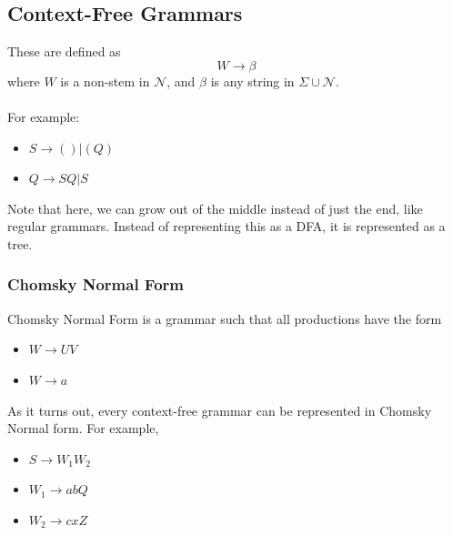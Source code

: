 \documentclass[10pt]{article}
\begin{document}
\subsection*{Context-Free Grammars}
These are defined as
\[W \rightarrow \beta\]
where $W$ is a non-stem in $\mathcal{N}$, and $\beta$ is any string in $\Sigma \cup \mathcal{N}$.\\\\
For example:
\begin{itemize}
    \item $S \rightarrow () | (Q)$
    \item $Q \rightarrow SQ | S$
\end{itemize}
Note that here, we can grow out of the middle instead of just the end, like regular grammars.  Instead of representing this as a DFA, it is represented as a tree.

\subsubsection*{Chomsky Normal Form}
Chomsky Normal Form is a grammar such that all productions have the form
\begin{itemize}
    \item $W \rightarrow UV$
    \item $W \rightarrow a$
\end{itemize}
As it turns out, every context-free grammar can be represented in Chomsky Normal form.  For example,
\begin{itemize}
    \item $S \rightarrow W_1 W_2$
    \item $W_1 \rightarrow abQ$
    \item $W_2 \rightarrow cxZ$
\end{itemize}
\end{document}
